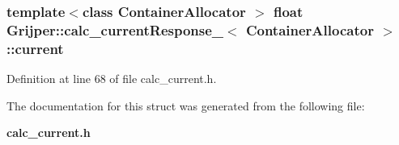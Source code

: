 \subsubsection[{current}]{\setlength{\rightskip}{0pt plus 5cm}template$<$class Container\-Allocator $>$ float {\bf Grijper\-::calc\-\_\-current\-Response\-\_\-}$<$ Container\-Allocator $>$\-::current}\label{structGrijper_1_1calc__currentResponse___a285754ebcbaf010bf2b9042776ddff97}


Definition at line 68 of file calc\-\_\-current.\-h.



The documentation for this struct was generated from the following file\-:\begin{DoxyCompactItemize}
\item 
{\bf calc\-\_\-current.\-h}\end{DoxyCompactItemize}
